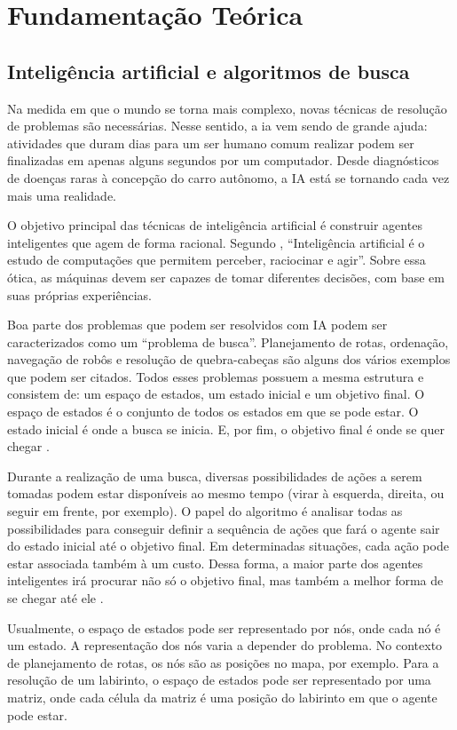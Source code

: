 \chapter{Fundamentação Teórica}
\label{chap:fundteor}

\section{Inteligência artificial e algoritmos de busca}
\label{ia_algoritmos_de_busca}
Na medida em que o mundo se torna mais complexo, novas técnicas de resolução de problemas são necessárias. Nesse sentido, a \gls*{ia} vem sendo de grande ajuda: atividades que duram dias para um ser humano comum realizar podem ser finalizadas em apenas alguns segundos por um computador. Desde diagnósticos de doenças raras à concepção do carro autônomo, a IA está se tornando cada vez mais uma realidade.

O objetivo principal das técnicas de inteligência artificial é construir agentes inteligentes que agem de forma racional. Segundo , “Inteligência artificial é o estudo de computações que permitem perceber, raciocinar e agir”. Sobre essa ótica, as máquinas devem ser capazes de tomar diferentes decisões, com base em suas próprias experiências.

Boa parte dos problemas que podem ser resolvidos com IA podem ser caracterizados como um “problema de busca”. Planejamento de rotas, ordenação, navegação de robôs e resolução de quebra-cabeças são alguns dos vários exemplos que podem ser citados. Todos esses problemas possuem a mesma estrutura e consistem de: um espaço de estados, um estado inicial e um objetivo final. O espaço de estados é o conjunto de todos os estados em que se pode estar. O estado inicial é onde a busca se inicia. E, por fim, o objetivo final é onde se quer chegar \cite{Akhtar2019}.

Durante a realização de uma busca, diversas possibilidades de ações a serem tomadas podem estar disponíveis ao mesmo tempo (virar à esquerda, direita, ou seguir em frente, por exemplo). O papel do algoritmo é analisar todas as possibilidades para conseguir definir a sequência de ações que fará o agente sair do estado inicial até o objetivo final. Em determinadas situações, cada ação pode estar associada também à um custo. Dessa forma, a maior parte dos agentes inteligentes irá procurar não só o objetivo final, mas também a melhor forma de se chegar até ele \cite{Endriss2015}.

Usualmente, o espaço de estados pode ser representado por nós, onde cada nó é um estado. A representação dos nós varia a depender do problema. No contexto de planejamento de rotas, os nós são as posições no mapa, por exemplo. Para a resolução de um labirinto, o espaço de estados pode ser representado por uma matriz, onde cada célula da matriz é uma posição do labirinto em que o agente pode estar.

